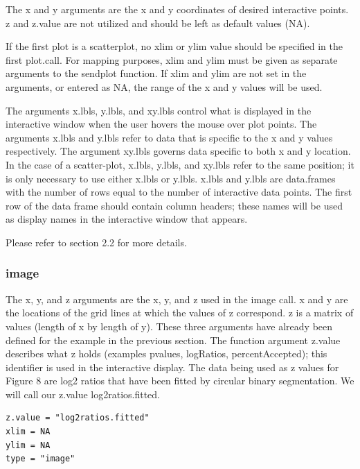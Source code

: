 \documentclass[]{article}
\begin{document}
\indent The x and y arguments are the x and y coordinates of desired interactive points. z and z.value are not utilized and should be left as default values (NA). 

\indent If the first plot is a scatterplot, no xlim or ylim value should be specified in the first plot.call. For mapping purposes, xlim and ylim must be given as separate arguments to the sendplot function. If xlim and ylim are not set in the arguments, or entered as NA, the range of the x and y values will be used.

\indent The arguments x.lbls, y.lbls, and xy.lbls control what is displayed in the interactive window when the user hovers the mouse over plot points. The arguments x.lbls and y.lbls refer to data that is specific to the x and y values respectively. The argument xy.lbls governs data specific to both x and y location. In the case of a scatter-plot, x.lbls, y.lbls, and xy.lbls refer to the same position; it is only necessary to use either x.lbls or y.lbls. x.lbls and y.lbls are data.frames with the number of rows equal to the number of interactive data points. The first row of the data frame should contain column headers; these names will be used as display names in the interactive window that appears. \newline

 Please refer to section 2.2 for more details. 

\subsubsection{image}

\indent The x, y, and z arguments are the x, y, and z used in the image call. x and y are the locations of the grid lines at which the values of z correspond. z is a matrix of values (length of x  by length of y).  These three arguments have already been defined for the example in the previous section. The function argument z.value describes what z holds (examples pvalues, logRatios, percentAccepted); this identifier is used in the interactive display. The data being used as z values for Figure 8 are log2 ratios that have been fitted by circular binary segmentation. We will call our z.value log2ratios.fitted.

\begin{verbatim}
z.value = "log2ratios.fitted"
xlim = NA
ylim = NA
type = "image" 
\end{verbatim}
\end{document}

